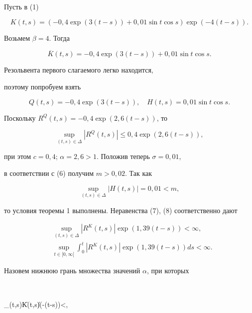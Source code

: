 \begin{examnonum} Пусть в (1)


$$


K(t,s)=(-0,4\exp(3(t-s))+0,01\sin t\cos s)\exp(-4(t-s)).


$$





Возьмем $\beta=4$. Тогда


$$


\overline K(t,s)=-0,4\exp(3(t-s))+0,01\sin t\cos s.


$$


Резольвента первого слагаемого легко находится,


поэтому попробуем взять


$$


Q(t,s)=-0,4\exp(3(t-s)),\quad H(t,s)=0,01\sin t\cos s.


$$


Поскольку $R^Q(t,s)=-0,4\exp(2,6(t-s))$, то


$$


\sup\limits_{(t,s)\in\Delta}|R^Q(t,s)|\le 0,4\exp(2,6(t-s)),


$$


при этом $c=0,4$; $\alpha=2,6>1$. Положив теперь $\sigma=0,01$,


в соответствии с (6) получим $m>0,02$. Так как


$$


\sup\limits_{(t,s)\in\Delta}|H(t,s)|=0,01<m,


$$


то условия теоремы 1 выполнены. Неравенства (7), (8) соответственно дают


\begin{align}


&\sup\limits_{(t,s)\in\Delta}|R^K(t,s)|\exp(1,39(t-s))<\infty,\\


&\sup\limits_{t\in[0,\infty[}\int_0^t|R^K(t,s)|\exp(1,39(t-s))ds<\infty.


\end{align}


\end{examnonum}





Назовем нижнюю грань множества значений $\alpha$, при которых


$$


\vraisup\limits_{(t,s)\in\Delta}\|K(t,s)\|\exp(-\alpha(t-s))<\infty,


